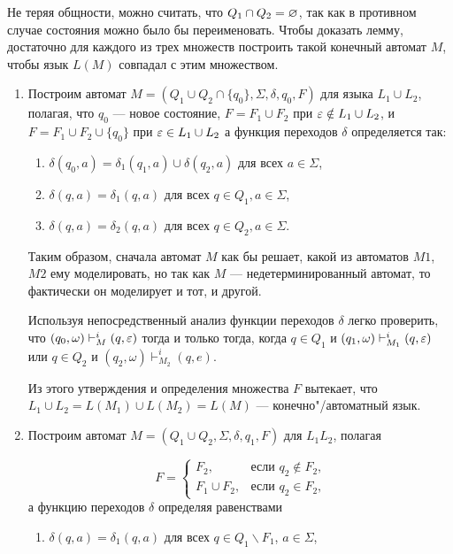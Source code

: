 \begin{myproof}
Не теряя общности, можно считать, что $Q_1\cap Q_2=\varnothing$, так как в противном случае состояния можно было бы переименовать. Чтобы доказать лемму, достаточно для каждого из трех множеств построить такой конечный автомат $M$, чтобы язык $L(M)$ совпадал с этим множеством.
\begin{enumerate}
\item Построим автомат $M=(Q_1\cup Q_2\cap\{q_0\},\Sigma,\delta,q_0,F)$ для языка $L_1\cup L_2$, полагая, что $q_0$ --- новое состояние, $F=F_1\cup F_2$ при $\varepsilon\notin L_1\cup L_2$, и $F=F_1\cup F_2\cup\{q_0\}$ при $\varepsilon\in L_1\cup L_2$ а функция переходов $\delta$ определяется так:
\begin{enumerate}[label=(\emph{\roman*})]
\item $\delta(q_0,a)=\delta_1(q_1,a)\cup\delta(q_2,a)$ для всех $a\in\Sigma$,
\item $\delta(q,a)=\delta_1(q,a)$ для всех $q\in Q_1, a\in\Sigma$,
\item $\delta(q,a)=\delta_2(q,a)$ для всех $q\in Q_2, a\in\Sigma$.
\end{enumerate}
Таким образом, сначала автомат $M$ как бы решает, какой из автоматов $M1$, $M2$ ему моделировать, но так как $M$ --- недетерминированный автомат, то фактически он моделирует и тот, и другой.

Используя непосредственный анализ функции переходов $\delta$ легко проверить, что $(q_0,\omega)\vdash_M^i(q,\varepsilon)$ тогда и только тогда, когда $q\in Q_1$ и $(q_1,\omega)\vdash_{M_1}^i(q,\varepsilon)$ или $q\in Q_2$ и $(q_2,\omega)\vdash_{M_2}^i(q,e)$.

Из этого утверждения и определения множества $F$ вытекает, что $L_1\cup L_2=L(M_1)\cup L(M_2)=L(M)$ --- конечно"/автоматный язык.

\item Построим автомат $M=(Q_1\cup Q_2,\Sigma,\delta,q_1,F)$ для $L_1L_2$, полагая

\begin{equation*}
F =
\begin{cases}
	F_2, & \text{если $q_2\notin F_2$,} \\
	F_1\cup F_2, & \text{если $q_2\in F_2$,}
\end{cases}
\end{equation*}
а функцию переходов $\delta$ определяя равенствами
\begin{enumerate}[label=(\emph{\roman*})]
\item $\delta(q,a)=\delta_1(q,a)$ для всех $q\in Q_1\backslash F_1$, $a\in\Sigma$,


\end{enumerate}
\end{enumerate}
\end{myproof}
